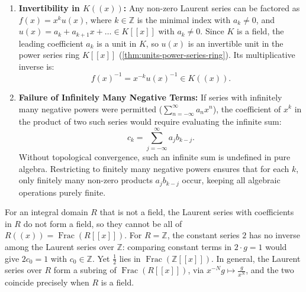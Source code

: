 \begin{content}

\begin{steps}
\begin{enumerate}[label=\textbf{(\arabic*)}]
    \item \textbf{Invertibility in $K((x))$:}
    Any non-zero Laurent series can be factored as $f(x) = x^k u(x)$, where $k \in \mathbb{Z}$ is the minimal index with $a_k \neq 0$, and $u(x) = a_k + a_{k+1} x + \dots \in K[[x]]$ with $a_k \neq 0$. Since $K$ is a field, the leading coefficient $a_k$ is a unit in $K$, so $u(x)$ is an invertible unit in the power series ring $K[[x]]$ (\cref{thm:units-power-series-ring}). Its multiplicative inverse is:
    \[
    f(x)^{-1} = x^{-k} u(x)^{-1} \in K((x)).
    \]
    \item \textbf{Failure of Infinitely Many Negative Terms:}
    If series with infinitely many negative powers were permitted ($\sum_{n=-\infty}^\infty a_n x^n$), the coefficient of $x^k$ in the product of two such series would require evaluating the infinite sum:
    \[
    c_k = \sum_{j=-\infty}^\infty a_j b_{k-j}.
    \]
    Without topological convergence, such an infinite sum is undefined in pure algebra. Restricting to finitely many negative powers ensures that for each $k$, only finitely many non-zero products $a_j b_{k-j}$ occur, keeping all algebraic operations purely finite.
\end{enumerate}
\end{steps}
\end{content}

\begin{aiNote}
For an integral domain $R$ that is not a field, the Laurent series with coefficients in $R$ do not form a field, so they cannot be all of $R((x)) = \operatorname{Frac}(R[[x]])$. For $R = \mathbb{Z}$, the constant series $2$ has no inverse among the Laurent series over $\mathbb{Z}$: comparing constant terms in $2 \cdot g = 1$ would give $2 c_0 = 1$ with $c_0 \in \mathbb{Z}$. Yet $\frac{1}{2}$ lies in $\operatorname{Frac}(\mathbb{Z}[[x]])$. In general, the Laurent series over $R$ form a subring of $\operatorname{Frac}(R[[x]])$, via $x^{-N} g \mapsto \frac{g}{x^N}$, and the two coincide precisely when $R$ is a field.
\end{aiNote}

